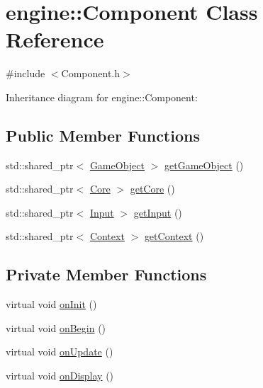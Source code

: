 \hypertarget{classengine_1_1_component}{}\section{engine\+:\+:Component Class Reference}
\label{classengine_1_1_component}


{\ttfamily \#include $<$Component.\+h$>$}



Inheritance diagram for engine\+:\+:Component\+:
\subsection*{Public Member Functions}
\begin{DoxyCompactItemize}
\item 
std\+::shared\+\_\+ptr$<$ \mbox{\hyperlink{classengine_1_1_game_object}{Game\+Object}} $>$ \mbox{\hyperlink{classengine_1_1_component_a9269a0f4fdf7f59e56da2dd2876b9f5e}{get\+Game\+Object}} ()
\item 
std\+::shared\+\_\+ptr$<$ \mbox{\hyperlink{classengine_1_1_core}{Core}} $>$ \mbox{\hyperlink{classengine_1_1_component_a1018f75dbd70ce43e2b1b9d64e6c0dab}{get\+Core}} ()
\item 
std\+::shared\+\_\+ptr$<$ \mbox{\hyperlink{classengine_1_1_input}{Input}} $>$ \mbox{\hyperlink{classengine_1_1_component_a20a4dbf78931291e09056c48a887b1f6}{get\+Input}} ()
\item 
std\+::shared\+\_\+ptr$<$ \mbox{\hyperlink{classengine_1_1_context}{Context}} $>$ \mbox{\hyperlink{classengine_1_1_component_aa96e31ff8a0fbb9273a008c856032176}{get\+Context}} ()
\end{DoxyCompactItemize}
\subsection*{Private Member Functions}
\begin{DoxyCompactItemize}
\item 
virtual void \mbox{\hyperlink{classengine_1_1_component_aeab591561127143769e9c4f004f85652}{on\+Init}} ()
\item 
virtual void \mbox{\hyperlink{classengine_1_1_component_ad92b830daf72bca1d94f541d47477d74}{on\+Begin}} ()
\item 
virtual void \mbox{\hyperlink{classengine_1_1_component_a3b256388549dbdeead09ebe7bd3ca0e6}{on\+Update}} ()
\item 
virtual void \mbox{\hyperlink{classengine_1_1_component_a86a7778d8754130072dbea2b1901728e}{on\+Display}} ()
\end{DoxyCompactItemize}
